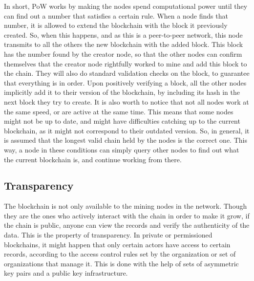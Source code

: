     
    In short, PoW works by making the nodes spend computational power until they can find out a number that satisfies a certain rule. %
    When a node finds that number, it is allowed to extend the blockchain with the block it previously created. So, when this happens, and as this is a peer-to-peer network, this node transmits to all the others the new blockchain with the added block.
    This block has the number found by the creator node, so that the other nodes can confirm themselves that the creator node rightfully worked to mine and add this block to the chain. They will also do standard validation checks on the block, to guarantee that everything is in order. Upon positively verifying a block, all the other nodes implicitly add it to their version of the blockchain, by including its hash in the next block they try to create. 
    It is also worth to notice that not all nodes work at the same speed, or are active at the same time. This means that some nodes might not be up to date, and might have difficulties catching up to the current blockchain, as it might not correspond to their outdated version. So, in general, it is assumed that the longest valid chain held by the nodes is the correct one. This way, a node in these conditions can simply query other nodes to find out what the current blockchain is, and continue working from there.
    
    \subsection{Transparency}
   The blockchain is not only available to the mining nodes in the network. Though they are the ones who actively interact with the chain in order to make it grow, if the chain is public, anyone can view the records and verify the authenticity of the data. This is the property of transparency. In private or permissioned blockchains, it might happen that only certain actors have access to certain records, according to the access control rules set by the organization or set of organizations that manage it. This is done with the help of sets of asymmetric key pairs and a public key infrastructure.
    


